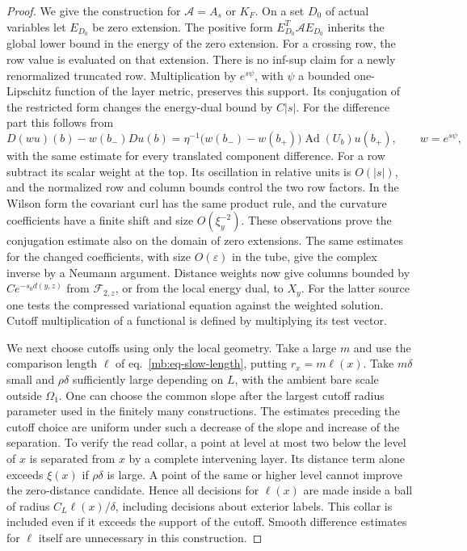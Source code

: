 \documentclass[11pt,letterpaper,reqno]{amsart}
\numberwithin{equation}{section}
\renewcommand{\eqref}[1]{\textup{eq.~\ref{#1}}}
\theoremstyle{definition}
\theoremstyle{remark}
\begin{document}
\begin{proof}
We give the construction for \(\mathcal A=A_s\) or \(K_F\). On a set \(D_0\) of actual variables let \(E_{D_0}\) be zero extension. The positive form \(E_{D_0}^T\mathcal A E_{D_0}\) inherits the global lower bound in the energy of the zero extension. For a crossing row, the row value is evaluated on that extension. There is no inf-sup claim for a newly renormalized truncated row. Multiplication by \(e^{s\psi}\), with \(\psi\) a bounded one-Lipschitz function of the layer metric, preserves this support. Its conjugation of the restricted form changes the energy-dual bound by \(C|s|\). For the difference part this follows from
\[
 D(wu)(b)-w(b_-)Du(b)
       =\eta^{-1}\bigl(w(b_-)-w(b_+)\bigr)\operatorname{Ad}(U_b)u(b_+),
 \qquad w=e^{s\psi},
\]
with the same estimate for every translated component difference. For a row subtract its scalar weight at the top. Its oscillation in relative units is \(O(|s|)\), and the normalized row and column bounds control the two row factors. In the Wilson form the covariant curl has the same product rule, and the curvature coefficients have a finite shift and size \(O(\xi_y^{-2})\). These observations prove the conjugation estimate also on the domain of zero extensions. The same estimates for the changed coefficients, with size \(O(\varepsilon)\) in the tube, give the complex inverse by a Neumann argument. Distance weights now give columns bounded by \(Ce^{-s_0d(y,z)}\) from \(\mathcal F_{2,z}\), or from the local energy dual, to \(X_y\). For the latter source one tests the compressed variational equation against the weighted solution. Cutoff multiplication of a functional is defined by multiplying its test vector.

We next choose cutoffs using only the local geometry. Take a large \(m\) and use the comparison length \(\ell\) of \eqref{mb:eq-slow-length}, putting \(r_x=m\ell(x)\). Take \(m\delta\) small and \(\rho\delta\) sufficiently large depending on \(L\), with the ambient bare scale outside \(\Omega_1\). One can choose the common slope after the largest cutoff radius parameter used in the finitely many constructions. The estimates preceding the cutoff choice are uniform under such a decrease of the slope and increase of the separation. To verify the read collar, a point at level at most two below the level of \(x\) is separated from \(x\) by a complete intervening layer. Its distance term alone exceeds \(\xi(x)\) if \(\rho\delta\) is large. A point of the same or higher level cannot improve the zero-distance candidate. Hence all decisions for \(\ell(x)\) are made inside a ball of radius \(C_L\ell(x)/\delta\), including decisions about exterior labels. This collar is included even if it exceeds the support of the cutoff. Smooth difference estimates for \(\ell\) itself are unnecessary in this construction.


\end{proof}
\end{document}
